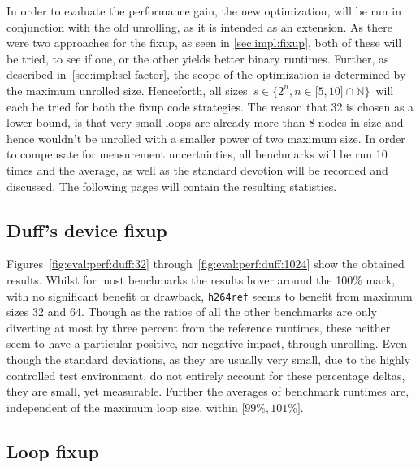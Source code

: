 In order to evaluate the performance gain, the new optimization, will be run in conjunction with the old unrolling, as it is intended as an extension.
As there were two approaches for the fixup, as seen in \cref{sec:impl:fixup}, both of these will be tried, to see if one, or the other yields better binary runtimes.
Further, as described in~\cref{sec:impl:sel-factor}, the scope of the optimization is determined by the maximum unrolled size.
Henceforth, all sizes~$s \in \{2^n, n \in \lbrack 5, 10 \rbrack \cap \mathbb{N}\}$~will each be tried for both the fixup code strategies.
The reason that 32 is chosen as a lower bound, is that very small loops are already more than 8 nodes in size and hence wouldn't be unrolled with a smaller power of two maximum size.
In order to compensate for measurement uncertainties, all benchmarks will be run 10 times and the average, as well as the standard devotion will be recorded and discussed.
The following pages will contain the resulting statistics.

\subsection{Duff's device fixup}\label{sec:eval:perf:duff}



Figures~\ref{fig:eval:perf:duff:32} through~\ref{fig:eval:perf:duff:1024} show the obtained results.
Whilst for most benchmarks the results hover around the 100\% mark, with no significant benefit or drawback, \texttt{h264ref} seems to benefit from maximum sizes 32 and 64.
Though as the ratios of all the other benchmarks are only diverting at most by three percent from the reference runtimes, these neither seem to have a particular positive, nor negative impact, through unrolling.
Even though the standard deviations, as they are usually very small, due to the highly controlled test environment, do not entirely account for these percentage deltas, they are small, yet measurable.
Further the averages of benchmark runtimes are, independent of the maximum loop size, within $\lbrack 99\%, 101\% \rbrack$.

\subsection{Loop fixup}\label{sec:eval:perf:loop}